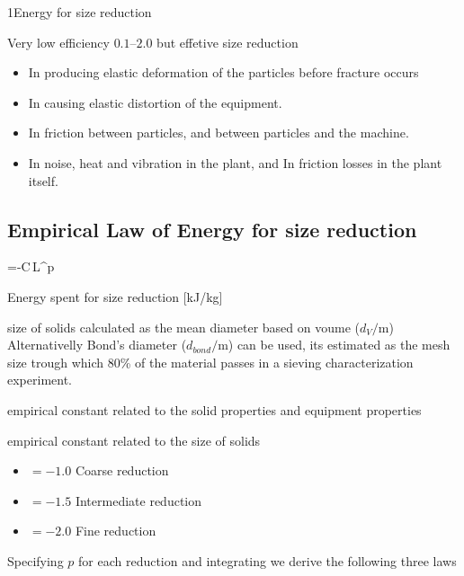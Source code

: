 \documentclass[\mainfilename]{subfiles}
\begin{document}
\begin{sectionBox}1{Energy for size reduction} %
    
    Very low efficiency \(\numrange{0.1}{2.0}\) but effetive size reduction
    \begin{itemize}
        \item In producing elastic deformation of the particles before fracture occurs
        \item In causing elastic distortion of the equipment.
        \item In friction between particles, and between particles and the machine.
        \item In noise, heat and vibration in the plant, and In friction losses in the plant itself.
    \end{itemize}

    \subsection*{Empirical Law of Energy for size reduction}
    \begin{BM}
        =-C\,L^p
    \end{BM}
    \begin{description}[
        leftmargin=!,
        labelwidth=\widthof{\(E\)} %
    ]
        \item[\(E\)] Energy spent for size reduction 
        {[\unit{\kilo\joule/\kilo\gram}]}
        \item[\(L\)] size of solids calculated as the mean diameter based on voume (\(d_V/\unit{\metre}\)) \\Alternativelly Bond's diameter (\(d_{bond}/\unit{\metre}\)) can be used, its estimated as the mesh size trough which 80\% of the material passes in a sieving characterization experiment.
        \item[\(C\)] empirical constant related to the solid properties and equipment properties
        \item[\(p\)] empirical constant related to the size of solids
        \begin{itemize}
            \item \(=-1.0\) Coarse reduction
            \item \(=-1.5\) Intermediate reduction
            \item \(=-2.0\) Fine reduction
        \end{itemize}
    \end{description}
    Specifying \(p\) for each reduction and integrating we derive the following three laws

\end{sectionBox}
\end{document}
